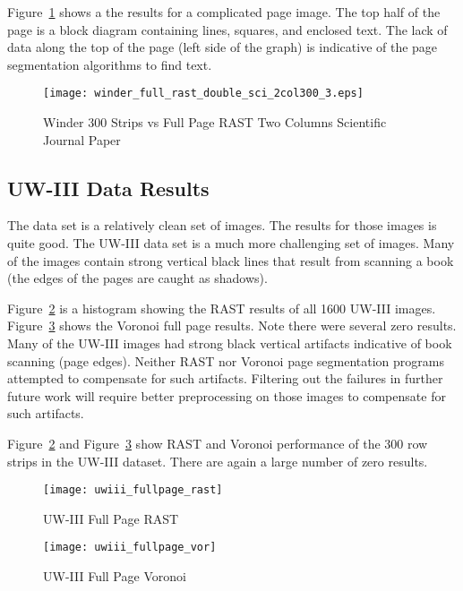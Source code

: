 \documentclass[conference]{IEEEtran}
\begin{document}
Figure~\ref{fig:winder-300-double-pic-sci-2col300} shows a the results for a
complicated page image. The top half of the page is a block diagram containing
lines, squares, and enclosed text. The lack of data along the top of the page
(left side of the graph) is indicative of the page segmentation algorithms to
find text.

\begin{figure}[winder-300-double-pic-sci-2col300]
\texttt{[image: winder\_full\_rast\_double\_sci\_2col300\_3.eps]}
\caption{Winder 300 Strips vs Full Page RAST Two Columns Scientific Journal Paper}
\label{fig:winder-300-double-pic-sci-2col300}
\end{figure}


%
%
\subsection{UW-III Data Results}

The \cite{IEEEhowto:Winder} data set is a relatively clean set of images. The results for
those images is quite good. The UW-III data set is a much more challenging set
of images. Many of the images contain strong vertical black lines that result
from scanning a book (the edges of the pages are caught as shadows). 

Figure~\ref{fig:uwiii-fullpage-rast} is a histogram showing the RAST results of
all 1600 UW-III images.  Figure~\ref{fig:uwiii-fullpage-vor} shows the Voronoi
full page results. Note there were several zero results. Many of the UW-III
images had strong black vertical artifacts indicative of book scanning (page
edges). Neither RAST nor Voronoi page segmentation programs
attempted to compensate for such artifacts. Filtering out the failures in
further future work will require better preprocessing on those images to
compensate for such artifacts. 

Figure~\ref{fig:uwiii-fullpage-rast} and Figure~\ref{fig:uwiii-fullpage-vor}
show RAST and Voronoi performance of the 300 row strips in the UW-III
dataset. There are again a large number of zero results. 

\begin{figure}[uwiii-fullpage-rast]
\texttt{[image: uwiii\_fullpage\_rast]}
\caption{UW-III Full Page RAST}
\label{fig:uwiii-fullpage-rast}
\end{figure}

\begin{figure}[uwiii-fullpage-vor]
\texttt{[image: uwiii\_fullpage\_vor]}
\caption{UW-III Full Page Voronoi}
\label{fig:uwiii-fullpage-vor}
\end{figure}
\end{document}
